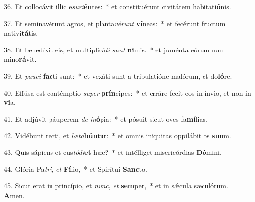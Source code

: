 36. Et collocávit illic e\textit{su}\textit{ri}\textbf{én}tes:~*  et constituérunt civitátem habitati\textbf{ó}nis.\

37. Et seminavérunt agros, et planta\textit{vé}\textit{runt} \textbf{ví}neas:~*  et fecérunt fructum nativi\textbf{tá}tis.\

38. Et benedíxit eis, et multiplicá\textit{ti} \textit{sunt} \textbf{ni}mis:~*  et juménta eórum non mino\textbf{rá}vit.\

39. Et \textit{pau}\textit{ci} \textbf{fac}ti sunt:~*  et vexáti sunt a tribulatióne malórum, et do\textbf{ló}re.\

40. Effúsa est contémptio \textit{su}\textit{per} \textbf{prín}cipes:~*  et erráre fecit eos in ínvio, et non in \textbf{vi}a.\

41. Et adjúvit páuperem \textit{de} \textit{in}\textbf{ó}pia:~*  et pósuit sicut oves fa\textbf{mí}lias.\

42. Vidébunt recti, et \textit{læ}\textit{ta}\textbf{bún}tur:~*  et omnis iníquitas oppilábit os \textbf{su}um.\

43. Quis sápiens et cus\textit{tó}\textit{di}\textbf{et} hæc?~*  et intélliget misericórdias \textbf{Dó}mini.\

44. Glória Pa\textit{tri}, \textit{et} \textbf{Fí}lio,~*  et Spirítui \textbf{Sanc}to.\

45. Sicut erat in princípio, et \textit{nunc}, \textit{et} \textbf{sem}per,~*  et in sǽcula sæculórum. \textbf{A}men.\

